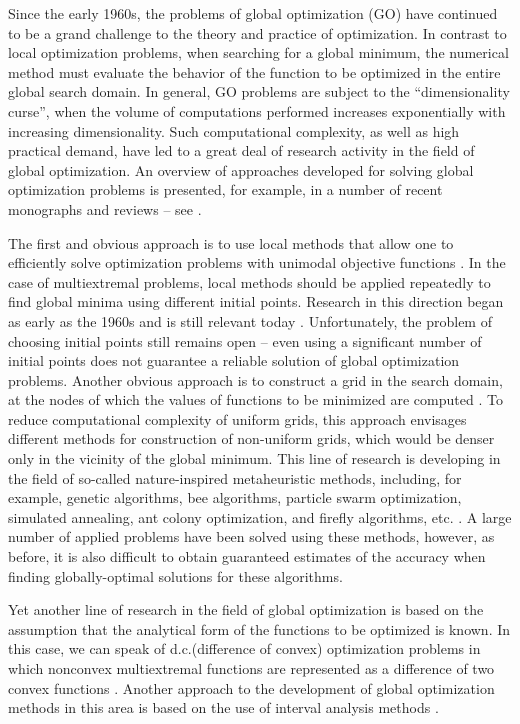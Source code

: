 \documentclass[review]{elsarticle}
\begin{document}
Since the early 1960s, the problems of global optimization (GO) have continued to be a grand challenge to the theory and practice of optimization. In contrast to local optimization problems, when searching for a global minimum, the numerical method must evaluate the behavior of the function to be optimized in the entire global search domain. In general, GO problems are subject to the ``dimensionality curse'', when the volume of computations performed increases exponentially with increasing dimensionality. Such computational complexity, as well as high practical demand, have led to a great deal of research activity in the field of global optimization. An overview of approaches developed for solving global optimization problems is presented, for example, in a number of recent monographs and reviews -- see \cite{c1,c2,c3,c4,c5,c6,c7,c8,c9}.

The first and obvious approach is to use local methods that allow one to efficiently solve optimization problems with unimodal objective functions \cite{c1}. In the case of multiextremal problems, local methods should be applied repeatedly to find global minima using different initial points. Research in this direction began as early as the 1960s and is still relevant today \cite{c10,c11,c12}. Unfortunately, the problem of choosing initial points still remains open -- even using a significant number of initial points does not guarantee a reliable solution of global optimization problems. Another obvious approach is to construct a grid in the search domain, at the nodes of which the values of functions to be minimized are computed \cite{c2,c3,c4,c5}. To reduce computational complexity of uniform grids, this approach envisages different methods for construction of non-uniform grids, which would be denser only in the vicinity of the global minimum. This line of research is developing in the field of so-called nature-inspired metaheuristic methods, including, for example, genetic algorithms, bee algorithms, particle swarm optimization, simulated annealing, ant colony optimization, and firefly algorithms, etc. \cite{c4,c13,c14,c15}. A large number of applied problems have been solved using these methods, however, as before, it is also difficult to obtain guaranteed estimates of the accuracy when finding globally-optimal solutions for these algorithms.

Yet another line of research in the field of global optimization is based on the assumption that the analytical form of the functions to be optimized is known. In this case, we can speak of d.c.(difference of convex) optimization problems in which nonconvex multiextremal functions are represented as a difference of two convex functions \cite{c16,c17}. Another approach to the development of global optimization methods in this area is based on the use of interval analysis methods \cite{c18}.
\end{document}
